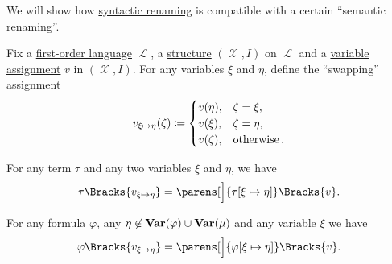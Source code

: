 \begin{proposition}\label{thm:swapping_assignment_compatibility}
  We will show how \hyperref[rem:first_order_substitution_renaming_justification]{syntactic renaming} is compatible with a certain \enquote{semantic renaming}.

  Fix a \hyperref[def:first_order_syntax]{first-order language} \( \mscrL \), a \hyperref[def:first_order_structure]{structure} \( (\mscrX, I) \) on \( \mscrL \) and a \hyperref[def:first_order_valuation/variable_assignment]{variable assignment} \( v \) in \( (\mscrX, I) \). For any variables \( \xi \) and \( \eta \), define the \enquote{swapping} assignment
  \begin{equation}\label{eq:thm:swapping_assignment_compatibility/swapping_assignment}
    v_{\xi \mapsto \eta}(\zeta) \coloneqq \begin{cases}
      v(\eta),  &\zeta = \xi, \\
      v(\xi),   &\zeta = \eta, \\
      v(\zeta), &\mathop{\text{otherwise}}.
    \end{cases}
  \end{equation}

  \begin{thmenum}
     For any term \( \tau \) and any two variables \( \xi \) and \( \eta \), we have
    \begin{equation}\label{eq:thm:swapping_assignment_compatibility/terms}
      \tau\Bracks{v_{\xi \mapsto \eta}}
      =
      \parens[\Big]{ \tau[\xi \mapsto \eta] }\Bracks{v}.
    \end{equation}

     For any formula \( \varphi \), any \( \eta \not\in \operatorname{\mathbf{Var}}(\varphi) \cup \operatorname{\mathbf{Var}}(\mu) \) and any variable \( \xi \) we have
    \begin{equation}\label{eq:thm:swapping_assignment_compatibility/formulas}
      \varphi\Bracks{v_{\xi \mapsto \eta}}
      =
      \parens[\Big]{ \varphi[\xi \mapsto \eta] }\Bracks{v}.
    \end{equation}
  \end{thmenum}
\end{proposition}
